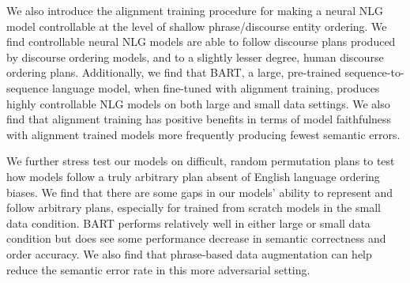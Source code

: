 We also introduce the alignment training procedure for making a neural NLG
model controllable at the level of shallow phrase/discourse entity ordering.
We find controllable neural NLG models are able to follow discourse plans
produced by discourse ordering models, and to a slightly lesser degree, human
discourse ordering plans. Additionally, we find that BART, a large,
pre-trained sequence-to-sequence language model, when fine-tuned with
alignment training, produces highly controllable NLG models on both large and
small data settings. We also find that alignment training has positive
benefits in terms of model faithfulness with alignment trained models more
frequently producing fewest semantic errors.

We further stress test our models on difficult, random permutation plans to
test how models follow a truly arbitrary plan absent of English language
ordering biases. We find that there are some gaps in our models' ability to
represent and follow arbitrary plans, especially for trained from scratch
models in the small data condition. BART performs relatively well in either
large or small data condition but does see some performance decrease in
semantic correctness and order accuracy. We also find that phrase-based data
augmentation can help reduce the semantic error rate in this more adversarial
setting.
